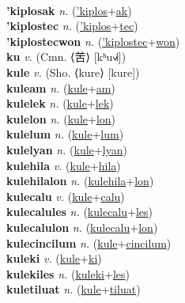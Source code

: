  \label{'kiplos} \\
\textbf{'kiplosak} \textit{n.} (\hyperref['kiplos]{'kiplos}+\hyperref[ak]{ak})
 \label{'kiplosak} \\
\textbf{'kiplostec} \textit{n.} (\hyperref['kiplos]{'kiplos}+\hyperref[tec]{tec})
 \label{'kiplostec} \\
\textbf{'kiplostecwon} \textit{n.} (\hyperref['kiplostec]{'kiplostec}+\hyperref[won]{won})
 \label{'kiplostecwon} \\
\textbf{ku} \textit{v.} (Cmn. ⟨苦⟩ [kʰu˧˩˧])
 \label{ku} \\
\textbf{kule} \textit{v.} (Sho. ⟨kure⟩ [kure])
 \label{kule} \\
\textbf{kuleam} \textit{n.} (\hyperref[kule]{kule}+\hyperref[am]{am})
 \label{kuleam} \\
\textbf{kulelek} \textit{n.} (\hyperref[kule]{kule}+\hyperref[lek]{lek})
 \label{kulelek} \\
\textbf{kulelon} \textit{n.} (\hyperref[kule]{kule}+\hyperref[lon]{lon})
 \label{kulelon} \\
\textbf{kulelum} \textit{n.} (\hyperref[kule]{kule}+\hyperref[lum]{lum})
 \label{kulelum} \\
\textbf{kulelyan} \textit{n.} (\hyperref[kule]{kule}+\hyperref[lyan]{lyan})
 \label{kulelyan} \\
\textbf{kulehila} \textit{v.} (\hyperref[kule]{kule}+\hyperref[hila]{hila})
 \label{kulehila} \\
\textbf{kulehilalon} \textit{n.} (\hyperref[kulehila]{kulehila}+\hyperref[lon]{lon})
 \label{kulehilalon} \\
\textbf{kulecalu} \textit{v.} (\hyperref[kule]{kule}+\hyperref[calu]{calu})
 \label{kulecalu} \\
\textbf{kulecalules} \textit{n.} (\hyperref[kulecalu]{kulecalu}+\hyperref[les]{les})
 \label{kulecalules} \\
\textbf{kulecalulon} \textit{n.} (\hyperref[kulecalu]{kulecalu}+\hyperref[lon]{lon})
 \label{kulecalulon} \\
\textbf{kulecincilum} \textit{n.} (\hyperref[kule]{kule}+\hyperref[cincilum]{cincilum})
 \label{kulecincilum} \\
\textbf{kuleki} \textit{v.} (\hyperref[kule]{kule}+\hyperref[ki]{ki})
 \label{kuleki} \\
\textbf{kulekiles} \textit{n.} (\hyperref[kuleki]{kuleki}+\hyperref[les]{les})
 \label{kulekiles} \\
\textbf{kuletiluat} \textit{n.} (\hyperref[kule]{kule}+\hyperref[tiluat]{tiluat})
 \label{kuletiluat} \\

